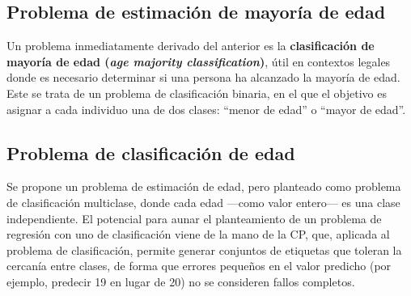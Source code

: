 
\subsection{Problema de estimación de mayoría de edad}

Un problema inmediatamente derivado del anterior es la \textbf{clasificación de mayoría de edad (\textit{age majority classification})}, útil en contextos legales donde es necesario determinar si una persona ha alcanzado la mayoría de edad. Este se trata de un problema de clasificación binaria, en el que el objetivo es asignar a cada individuo una de dos clases: ``menor de edad'' o ``mayor de edad''.




\subsection{Problema de clasificación de edad}

Se propone un problema de estimación de edad, pero planteado como problema de clasificación multiclase, donde cada edad ---como valor entero--- es una clase independiente. 
El potencial para aunar el planteamiento de un problema de regresión con uno de clasificación viene de la mano de la CP, que, aplicada al problema de clasificación, permite generar conjuntos de etiquetas que toleran la cercanía entre clases, de forma que errores pequeños en el valor predicho (por ejemplo, predecir 19 en lugar de 20) no se consideren fallos completos.



